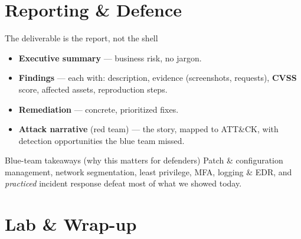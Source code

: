 \documentclass[aspectratio=169,11pt]{beamer}
\begin{document}
\section{Reporting \& Defence}

\begin{frame}{The deliverable is the report, not the shell}
  \begin{itemize}
    \item \textbf{Executive summary} --- business risk, no jargon.
    \item \textbf{Findings} --- each with: description, evidence (screenshots,
          requests), \textbf{CVSS} score, affected assets, reproduction steps.
    \item \textbf{Remediation} --- concrete, prioritized fixes.
    \item \textbf{Attack narrative} (red team) --- the story, mapped to ATT\&CK,
          with detection opportunities the blue team missed.
  \end{itemize}
  \vspace{0.4em}
  \begin{block}{Blue-team takeaways (why this matters for defenders)}
    Patch \& configuration management, network segmentation, least privilege,
    MFA, logging \& EDR, and \emph{practiced} incident response defeat most of
    what we showed today.
  \end{block}
\end{frame}

\section{Lab \& Wrap-up}
\end{document}
